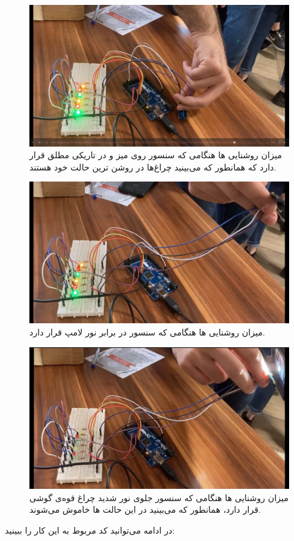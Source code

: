 \documentclass[12pt,a4paper]{article}
\begin{document}
\begin{figure}[H]
	\centering
	\includegraphics[scale=0.2]{figs/dark-light.png}
	\caption{
		میزان روشنایی
		ها هنگامی که سنسور روی میز و در تاریکی مطلق قرار دارد که همانطور که می‌بینید چراغ‌ها در روشن ترین حالت خود هستند.}
	\label{fig:dark}
\end{figure}

\begin{figure}[H]
	\centering
	\includegraphics[scale=0.2]{figs/normal-light.png}
	\caption{میزان روشنایی 
ها هنگامی که سنسور در برابر نور لامپ قرار دارد.	
}
	\label{fig:normal}
\end{figure}




\begin{figure}[H]
	\centering
	\includegraphics[scale=0.2]{figs/extreme-light.png}
	\caption{
		میزان روشنایی 
		ها هنگامی که سنسور جلوی نور شدید چراغ‌ قوه‌ی گوشی قرار دارد، همانطور که می‌بینید در این حالت 
		ها خاموش می‌شوند.	
	}
	\label{fig:torch}
\end{figure}

در ادامه می‌توانید کد مربوط به این کار را ببینید:
\begin{latin}
	
\end{latin}
\end{document}
